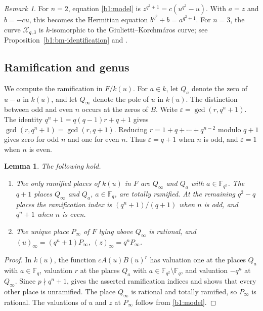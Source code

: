 \documentclass[12pt,reqno]{amsart}
\numberwithin{equation}{section}
\newcommand{\F}{\mathbb F}
\theoremstyle{plain}
\newtheorem{lemma}[theorem]{Lemma}
\theoremstyle{definition}
\theoremstyle{remark}
\newtheorem{remark}[theorem]{Remark}
\begin{document}
\begin{remark}
\label{b1:small-members}
For \(n=2\), equation \eqref{b1:model} is
\(z^{q^2+1}=c(u^{q^2}-u)\).  With \(a=z\) and \(b=-cu\), this
becomes the Hermitian equation \(b^{q^2}+b=a^{q^2+1}\).
For \(n=3\), the curve \(\mathcal X_{q,3}\) is \(k\)-isomorphic to
the Giulietti--Korchm\'aros curve; see
Proposition~\ref{b1:bm-identification} and \cite[Section~2]{BM2018}.
\end{remark}

\subsection{Ramification and genus}

We compute the ramification in \(F/k(u)\). For \(a\in k\), let
\(Q_a\) denote the zero of \(u-a\) in \(k(u)\), and let
\(Q_\infty\) denote the pole of \(u\) in \(k(u)\).
The distinction between odd and even \(n\) occurs at the zeros of \(B\). Write
\(\varepsilon=\gcd(r,q^n+1)\).
The identity \(q^n+1=q(q-1)r+q+1\) gives
\(\gcd(r,q^n+1)=\gcd(r,q+1)\).  Reducing
\(r=1+q+\cdots+q^{n-2}\) modulo \(q+1\) gives zero for odd \(n\)
and one for even \(n\). Thus \(\varepsilon=q+1\) when \(n\) is odd,
and \(\varepsilon=1\) when \(n\) is even.

\begin{lemma}
\label{b1:ramification}
The following hold.
\begin{enumerate}
\item\label{b1:ramification-indices}
The only ramified places of \(k(u)\) in \(F\) are \(Q_\infty\)
and \(Q_a\) with \(a\in\F_{q^2}\). The \(q+1\) places
\(Q_\infty\) and \(Q_a\), \(a\in\F_q\), are totally ramified.
At the remaining \(q^2-q\)
places the ramification index is \((q^n+1)/(q+1)\) when \(n\) is
odd, and \(q^n+1\) when \(n\) is even.
\item\label{b1:infinite-place}
The unique place \(P_\infty\) of \(F\) lying above \(Q_\infty\)
is rational, and
\((u)_\infty=(q^n+1)P_\infty\), \((z)_\infty=q^nP_\infty\).
\end{enumerate}
\end{lemma}

\begin{proof}
In \(k(u)\), the function \(cA(u)B(u)^r\) has valuation one at
the places \(Q_a\) with \(a\in\F_q\), valuation \(r\) at the places
\(Q_a\) with \(a\in\F_{q^2}\setminus\F_q\), and valuation
\(-q^n\) at \(Q_\infty\). Since \(p\nmid q^n+1\),
\cite[Proposition~3.7.3]{Stichtenoth2009} gives the asserted
ramification indices and shows that every other place is unramified.
The place \(Q_\infty\) is rational and totally ramified, so \(P_\infty\) is
rational. The valuations of \(u\) and \(z\) at \(P_\infty\) follow
from \eqref{b1:model}.
\end{proof}
\end{document}
